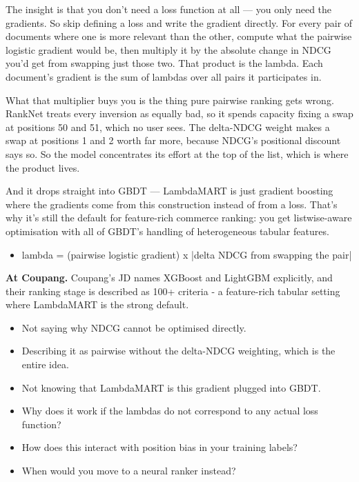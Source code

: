 \documentclass[10pt,twoside]{book}
\newenvironment{callout}{\begin{tcolorbox}[colback=soft,colframe=accent,boxrule=0.5pt,left=7pt,right=7pt,top=5pt,bottom=5pt]}{\end{tcolorbox}}
\newcommand{\lab}[1]{\par\vspace{5pt}\noindent{\sffamily\footnotesize\bfseries\color{accent}#1}\par\vspace{1pt}}
\newcommand{\flab}[1]{\par\vspace{5pt}\noindent{\sffamily\footnotesize\bfseries\color{flag}#1}\par\vspace{1pt}}
\begin{document}
The insight is that you don't need a loss function at all --- you only need the gradients. So skip defining a loss and write the gradient directly. For every pair of documents where one is more relevant than the other, compute what the pairwise logistic gradient would be, then multiply it by the absolute change in NDCG you'd get from swapping just those two. That product is the lambda. Each document's gradient is the sum of lambdas over all pairs it participates in.\par\vspace{3pt}
What that multiplier buys you is the thing pure pairwise ranking gets wrong. RankNet treats every inversion as equally bad, so it spends capacity fixing a swap at positions 50 and 51, which no user sees. The delta-NDCG weight makes a swap at positions 1 and 2 worth far more, because NDCG's positional discount says so. So the model concentrates its effort at the top of the list, which is where the product lives.\par\vspace{3pt}
And it drops straight into GBDT --- LambdaMART is just gradient boosting where the gradients come from this construction instead of from a loss. That's why it's still the default for feature-rich commerce ranking: you get listwise-aware optimisation with all of GBDT's handling of heterogeneous tabular features.\par\vspace{3pt}
\lab{Numbers}
\begin{itemize}
\item lambda = (pairwise logistic gradient) x |delta NDCG from swapping the pair|
\end{itemize}
\begin{callout}\textbf{At Coupang.} Coupang's JD names XGBoost and LightGBM explicitly, and their ranking stage is described as 100+ criteria - a feature-rich tabular setting where LambdaMART is the strong default.\end{callout}
\flab{Loses the signal}
\begin{itemize}
\item Not saying why NDCG cannot be optimised directly.
\item Describing it as pairwise without the delta-NDCG weighting, which is the entire idea.
\item Not knowing that LambdaMART is this gradient plugged into GBDT.
\end{itemize}
\lab{Then they ask}
\begin{itemize}
\item Why does it work if the lambdas do not correspond to any actual loss function?
\item How does this interact with position bias in your training labels?
\item When would you move to a neural ranker instead?
\end{itemize}
\end{document}
